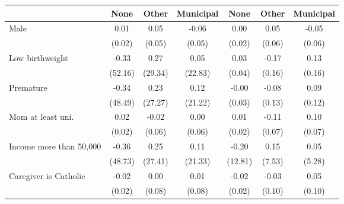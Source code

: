 {
\def\sym#1{\ifmmode^{#1}\else\(^{#1}\)\fi}
\begin{tabular}{l*{6}{c}}
\toprule
                    &\multicolumn{1}{c}{None}&\multicolumn{1}{c}{Other}&\multicolumn{1}{c}{Municipal}&\multicolumn{1}{c}{None}&\multicolumn{1}{c}{Other}&\multicolumn{1}{c}{Municipal}\\
\midrule
Male                &        0.01         &        0.05         &       -0.06         &        0.00         &        0.05         &       -0.05         \\
                    &      (0.02)         &      (0.05)         &      (0.05)         &      (0.02)         &      (0.06)         &      (0.06)         \\
\addlinespace
Low birthweight     &       -0.33         &        0.27         &        0.05         &        0.03         &       -0.17         &        0.13         \\
                    &     (52.16)         &     (29.34)         &     (22.83)         &      (0.04)         &      (0.16)         &      (0.16)         \\
\addlinespace
Premature      &       -0.34         &        0.23         &        0.12         &       -0.00         &       -0.08         &        0.09         \\
                    &     (48.49)         &     (27.27)         &     (21.22)         &      (0.03)         &      (0.13)         &      (0.12)         \\
\addlinespace
Mom at least uni. &        0.02         &       -0.02         &        0.00         &        0.01         &       -0.11         &        0.10         \\
                    &      (0.02)         &      (0.06)         &      (0.06)         &      (0.02)         &      (0.07)         &      (0.07)         \\
\addlinespace
Income more than 50,000  &       -0.36         &        0.25         &        0.11         &       -0.20         &        0.15         &        0.05         \\
                    &     (48.73)         &     (27.41)         &     (21.33)         &     (12.81)         &      (7.53)         &      (5.28)         \\
\addlinespace
Caregiver is Catholic&       -0.02         &        0.00         &        0.01         &       -0.02         &       -0.03         &        0.05         \\
                    &      (0.02)         &      (0.08)         &      (0.08)         &      (0.02)         &      (0.10)         &      (0.10)         \\

\end{tabular}}
